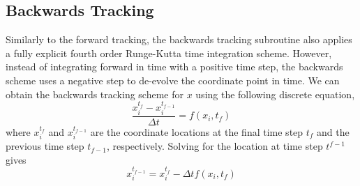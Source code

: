 \subsection{Backwards Tracking} 
Similarly to the forward tracking, the backwards tracking subroutine also
applies a fully explicit fourth order Runge-Kutta time integration scheme.
However, instead of integrating forward in time with a positive time step,
the backwards scheme uses a negative step to de-evolve the coordinate point
in time. We can obtain the backwards tracking scheme for $x$ using the
following discrete equation,
\begin{equation}
    \frac{x^{t_{f}}_{i}-x^{t_{f-1}}_{i}}{\Delta t} =
        f\left(x_{i}, t_{f}\right)
\end{equation}
where $x^{t_{f}}_{i}$ and $x^{t_{f-1}}_{i}$ are the coordinate locations at
the final time step $t_{f}$ and the previous time step $t_{f-1}$,
respectively. Solving for the location at time step $t^{f-1}$ gives 
\begin{equation}
    x^{t_{f-1}}_{i} = x^{t_{f}}_{i} - \Delta t f\left(x_{i}, t_{f}\right) 
\end{equation}
